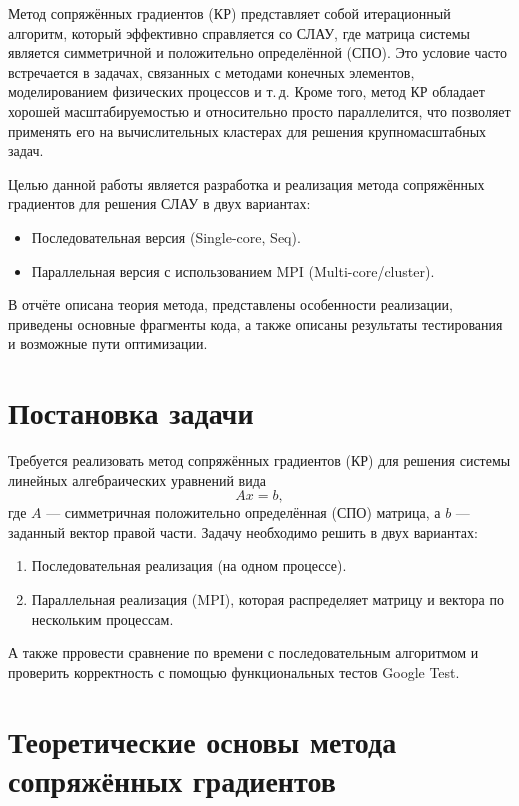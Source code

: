 \documentclass[12pt]{article}
\begin{document}
Метод сопряжённых градиентов (КР) представляет собой итерационный алгоритм, который эффективно справляется со СЛАУ, где матрица системы является симметричной и положительно определённой (СПО). Это условие часто встречается в задачах, связанных с методами конечных элементов, моделированием физических процессов и т.\,д. Кроме того, метод КР обладает хорошей масштабируемостью и относительно просто параллелится, что позволяет применять его на вычислительных кластерах для решения крупномасштабных задач.

Целью данной работы является разработка и реализация метода сопряжённых градиентов для решения СЛАУ в двух вариантах:
\begin{itemize}
    \item Последовательная версия (Single-core, Seq).
    \item Параллельная версия с использованием MPI (Multi-core/cluster).
\end{itemize}

В отчёте описана теория метода, представлены особенности реализации, приведены основные фрагменты кода, а также описаны результаты тестирования и возможные пути оптимизации.

\section{Постановка задачи}

\hspace*{1.25em} Требуется реализовать метод сопряжённых градиентов (КР) для решения системы линейных алгебраических уравнений вида
\[
    A x = b,
\]
где $A$ --- симметричная положительно определённая (СПО) матрица, а $b$ --- заданный вектор правой части.  
Задачу необходимо решить в двух вариантах:
\begin{enumerate}
    \item Последовательная реализация (на одном процессе).
    \item Параллельная реализация (MPI), которая распределяет матрицу и вектора по нескольким процессам.
\end{enumerate}
А также прровести сравнение по времени с последовательным алгоритмом и проверить корректность с помощью функциональных тестов Google Test.

\section{Теоретические основы метода сопряжённых градиентов}
\end{document}
